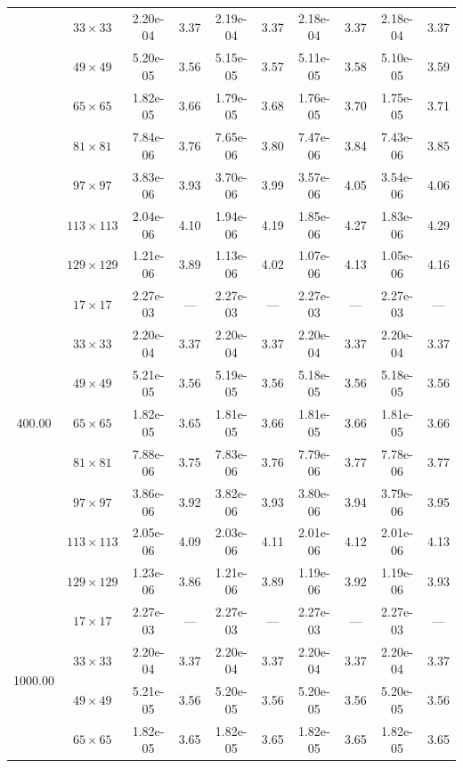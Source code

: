 \documentclass[preprint, 12pt]{elsarticle}
\begin{document}
\begin{center}
\begin{table}[H]
{\begin{tabular*}{\textwidth}{@{\extracolsep\fill}cccccccccc@{}}
    & $33\times 33$ & 2.20e-04 & 3.37 & 2.19e-04 & 3.37 & 2.18e-04 & 3.37 & 2.18e-04 & 3.37 \\
    & $49\times 49$ & 5.20e-05 & 3.56 & 5.15e-05 & 3.57 & 5.11e-05 & 3.58 & 5.10e-05 & 3.59 \\
    & $65\times 65$ & 1.82e-05 & 3.66 & 1.79e-05 & 3.68 & 1.76e-05 & 3.70 & 1.75e-05 & 3.71 \\
    & $81\times 81$ & 7.84e-06 & 3.76 & 7.65e-06 & 3.80 & 7.47e-06 & 3.84 & 7.43e-06 & 3.85 \\
    & $97\times 97$ & 3.83e-06 & 3.93 & 3.70e-06 & 3.99 & 3.57e-06 & 4.05 & 3.54e-06 & 4.06 \\
    & $113\times 113$ & 2.04e-06 & 4.10 & 1.94e-06 & 4.19 & 1.85e-06 & 4.27 & 1.83e-06 & 4.29 \\
    & $129\times 129$ & 1.21e-06 & 3.89 & 1.13e-06 & 4.02 & 1.07e-06 & 4.13 & 1.05e-06 & 4.16 \\
    \hline
    \multirow{7}{*}{400.00} & $17\times 17$ & 2.27e-03 & --- & 2.27e-03 & --- & 2.27e-03 & --- & 2.27e-03 & --- \\
    & $33\times 33$ & 2.20e-04 & 3.37 & 2.20e-04 & 3.37 & 2.20e-04 & 3.37 & 2.20e-04 & 3.37 \\
    & $49\times 49$ & 5.21e-05 & 3.56 & 5.19e-05 & 3.56 & 5.18e-05 & 3.56 & 5.18e-05 & 3.56 \\
    & $65\times 65$ & 1.82e-05 & 3.65 & 1.81e-05 & 3.66 & 1.81e-05 & 3.66 & 1.81e-05 & 3.66 \\
    & $81\times 81$ & 7.88e-06 & 3.75 & 7.83e-06 & 3.76 & 7.79e-06 & 3.77 & 7.78e-06 & 3.77 \\
    & $97\times 97$ & 3.86e-06 & 3.92 & 3.82e-06 & 3.93 & 3.80e-06 & 3.94 & 3.79e-06 & 3.95 \\
    & $113\times 113$ & 2.05e-06 & 4.09 & 2.03e-06 & 4.11 & 2.01e-06 & 4.12 & 2.01e-06 & 4.13 \\
    & $129\times 129$ & 1.23e-06 & 3.86 & 1.21e-06 & 3.89 & 1.19e-06 & 3.92 & 1.19e-06 & 3.93 \\
    \hline
    \multirow{7}{*}{1000.00} & $17\times 17$ & 2.27e-03 & --- & 2.27e-03 & --- & 2.27e-03 & --- & 2.27e-03 & --- \\
    & $33\times 33$ & 2.20e-04 & 3.37 & 2.20e-04 & 3.37 & 2.20e-04 & 3.37 & 2.20e-04 & 3.37 \\
    & $49\times 49$ & 5.21e-05 & 3.56 & 5.20e-05 & 3.56 & 5.20e-05 & 3.56 & 5.20e-05 & 3.56 \\
    & $65\times 65$ & 1.82e-05 & 3.65 & 1.82e-05 & 3.65 & 1.82e-05 & 3.65 & 1.82e-05 & 3.65 \\

\end{tabular*}}
\end{table}
\end{center}
\end{document}
